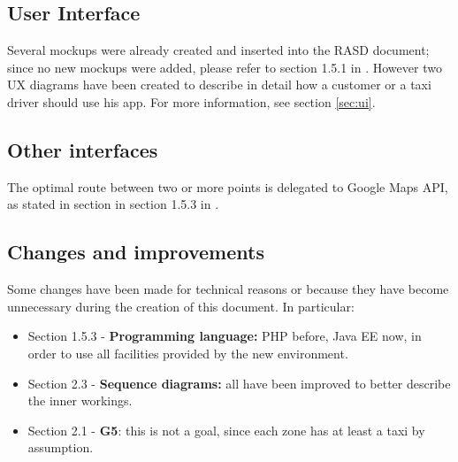 \newpage
\subsection*{User Interface}
Several mockups were already created and inserted into the RASD document; since no new mockups were added, please refer to section 1.5.1 in \cite{rasd}. However two UX diagrams have been created to describe in detail how a customer or a taxi driver should use his app. For more information, see section \ref{sec:ui}. 

\subsection*{Other interfaces}
The optimal route between two or more points is delegated to Google Maps API, as stated in section in section 1.5.3 in \cite{rasd}.

\subsection*{Changes and improvements}
Some changes have been made for technical reasons or because they have become unnecessary during the creation of this document. In particular:

\begin{itemize}
	\item Section 1.5.3 - \textbf{Programming language:} PHP before, Java EE now, in order to use all facilities provided by the new environment.
	\item Section 2.3 - \textbf{Sequence diagrams:} all have been improved to better describe the inner workings.
	\item Section 2.1 - \textbf{G5}: this is not a goal, since each zone has at least a taxi by assumption.
\end{itemize}